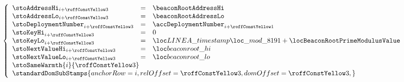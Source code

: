 \item[\underline{\underline{Storing the \inst{BEACONROOT} in the state:}}] 
	\[
		\left\{ \begin{array}{lclr}
			\stoAddressHi         _{i + \roffTxSkipSysiBeaconRootSystemContractStorageSetBeaconRoot} & = & \beaconRootAddressHi                                                       \\
			\stoAddressLo         _{i + \roffTxSkipSysiBeaconRootSystemContractStorageSetBeaconRoot} & = & \beaconRootAddressLo                                                       \\
			\stoDeploymentNumber  _{i + \roffTxSkipSysiBeaconRootSystemContractStorageSetBeaconRoot} & = & \accDeploymentNumber _{i + \roffTxSkipSysiBeaconRootSystemContractAccount} \\
			\stoKeyHi             _{i + \roffTxSkipSysiBeaconRootSystemContractStorageSetBeaconRoot} & = & 0                                                                          \\
			\stoKeyLo             _{i + \roffTxSkipSysiBeaconRootSystemContractStorageSetBeaconRoot} & = & \locLineaTimestampModuloPrime + \locBeaconRootPrimeModulusValue            \\
			\stoNextValueHi       _{i + \roffTxSkipSysiBeaconRootSystemContractStorageSetBeaconRoot} & = & \locBeaconRootHi                                                           \\
			\stoNextValueLo       _{i + \roffTxSkipSysiBeaconRootSystemContractStorageSetBeaconRoot} & = & \locBeaconRootLo                                                           \\
			\multicolumn{3}{l}{\stoSameWarmth  {i}{\roffTxSkipSysiBeaconRootSystemContractStorageSetBeaconRoot} } \\
			\multicolumn{3}{l}{
				\standardDomSubStamps {
					anchorRow = i                                                           ,
					relOffset = \roffTxSkipSysiBeaconRootSystemContractStorageSetBeaconRoot ,
					domOffset = \roffTxSkipSysiBeaconRootSystemContractStorageSetBeaconRoot ,
				}} \\
		\end{array} \right.
	\]
